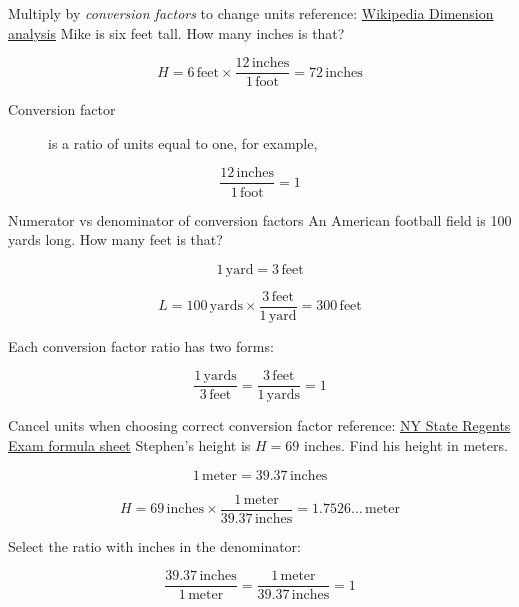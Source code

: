 \begin{frame}{Multiply by \emph{conversion factors} to change units}
  {reference: \href{https://en.wikipedia.org/wiki/Dimensional_analysis}{Wikipedia Dimension analysis}}
  Mike is six feet tall. How many inches is that? \par \medskip
  $$H = 6 \,\mathrm{feet} \times \displaystyle \frac{12 \,\mathrm{inches}}{1 \,\mathrm{foot}} = 72 \,\mathrm{inches}$$
  \begin{description}
    \item[Conversion factor] is a ratio of units equal to one, for example, 
  \end{description}
  $$\displaystyle \frac{12 \,\mathrm{inches}}{1 \,\mathrm{foot}} = 1$$
    \vspace{3cm}
  \end{frame}

\begin{frame}{Numerator vs denominator of conversion factors}
  An American football field is 100 yards long. How many feet is that?  \par \smallskip
  $$1 \,\mathrm{yard} = 3 \,\mathrm{feet}$$ \par \medskip
   $$L = 100 \,\mathrm{yards} \times \displaystyle \frac{3 \,\mathrm{feet}}{1 \,\mathrm{yard}} = 300 \,\mathrm{feet}$$ \par \vspace{1cm}
  Each conversion factor ratio has two forms: \par \medskip
  $$\displaystyle  \frac{1 \,\mathrm{yards}}{3 \,\mathrm{feet}} = \frac{3 \,\mathrm{feet}}{1 \,\mathrm{yards}} = 1$$
  \end{frame}

\begin{frame}{Cancel units when choosing correct conversion factor}
  {reference: \href{https://www.nysedregents.org/geometryre/622/geom62022-exam.pdf}{NY State Regents Exam formula sheet}}
  Stephen's height is $H=69$ inches. Find his height in meters. \par \smallskip
   $$1 \,\mathrm{meter} = 39.37 \,\mathrm{inches}$$ \par \medskip
    $$H = 69 \,\mathrm{inches} \times \displaystyle \frac{1 \,\mathrm{meter}}{39.37 \,\mathrm{inches}} = 1.7526\dots \,\mathrm{meter}$$ \par \vspace{1cm}
    Select the ratio with inches in the denominator: \par \medskip
      $$\displaystyle  \frac{39.37 \,\mathrm{inches}}{1 \,\mathrm{meter}} = \frac{1 \,\mathrm{meter}}{39.37 \,\mathrm{inches}} = 1$$
  \end{frame}


